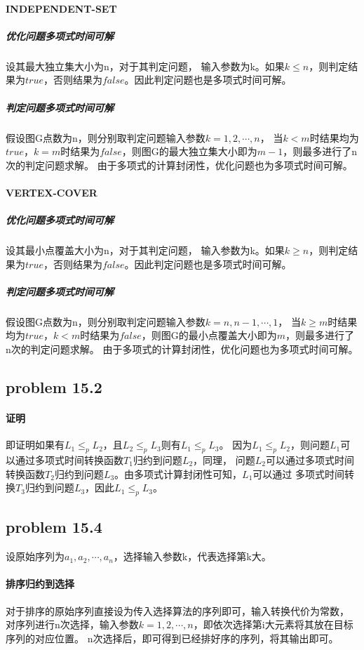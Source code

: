 \documentclass[11pt,a4paper,oneside,oldfontcommands]{ctexart}
\begin{document}
\paragraph*{INDEPENDENT-SET}
\subparagraph*{优化问题多项式时间可解}设其最大独立集大小为n，对于其判定问题，
输入参数为k。如果$k\leq n$，则判定结果为$true$，否则结果为$false$。因此判定问题也是多项式时间可解。
\subparagraph*{判定问题多项式时间可解}假设图G点数为n，则分别取判定问题输入参数$k=1,2,\cdots,n$，
当$k<m$时结果均为$true$，$k=m$时结果为$false$，则图G的最大独立集大小即为$m-1$，则最多进行了n次的判定问题求解。
由于多项式的计算封闭性，优化问题也为多项式时间可解。
\paragraph*{VERTEX-COVER}
\subparagraph*{优化问题多项式时间可解}设其最小点覆盖大小为n，对于其判定问题，
输入参数为k。如果$k\geq n$，则判定结果为$true$，否则结果为$false$。因此判定问题也是多项式时间可解。
\subparagraph*{判定问题多项式时间可解}假设图G点数为n，则分别取判定问题输入参数$k=n,n-1,\cdots,1$，
当$k\geq m$时结果均为$true$，$k<m$时结果为$false$，则图G的最小点覆盖大小即为$m$，则最多进行了n次的判定问题求解。
由于多项式的计算封闭性，优化问题也为多项式时间可解。
{\subsection*{problem 15.2}}
\paragraph*{证明}即证明如果有$L_1\leq_pL_2$，且$L_2\leq_pL_3$则有$L_1\leq_pL_3$。
因为$L_1\leq_pL_2$，则问题$L_1$可以通过多项式时间转换函数$T_1$归约到问题$L_2$，同理，
问题$L_2$可以通过多项式时间转换函数$T_2$归约到问题$L_3$。由多项式计算封闭性可知，$L_1$可以通过
多项式时间转换$T_3$归约到问题$L_3$，因此$L_1\leq_pL_3$。
{\subsection*{problem 15.4}}
设原始序列为$a_1,a_2,\cdots,a_n$，选择输入参数k，代表选择第k大。
\paragraph*{排序归约到选择}
对于排序的原始序列直接设为传入选择算法的序列即可，输入转换代价为常数，
对序列进行n次选择，输入参数$k=1,2,\cdots,n$，即依次选择第i大元素将其放在目标序列的对应位置。
n次选择后，即可得到已经排好序的序列，将其输出即可。
\end{document}
